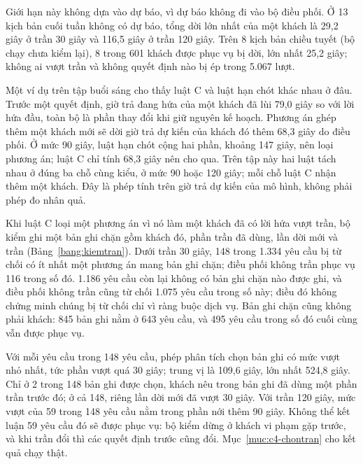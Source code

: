 Giới hạn này không dựa vào dự báo, vì dự báo không đi vào bộ điều phối. Ở 13 kịch bản cuối tuần không có dự báo, tổng
dời lớn nhất của một khách là 29,2 giây ở trần 30 giây và 116,5 giây ở trần 120 giây. Trên 8 kịch bản chiều tuyết (bộ
chạy chưa kiểm lại), 8 trong 601 khách được phục vụ bị dời, lớn nhất 25,2 giây; không ai vượt trần và không quyết định
nào bị ép trong 5.067 lượt.

Một ví dụ trên tập buổi sáng cho thấy luật C và luật hạn chót khác nhau ở đâu. Trước một quyết định, giờ trả đang hứa
của một khách đã lùi 79,0 giây so với lời hứa đầu, toàn bộ là phần thay đổi khi giữ nguyên kế hoạch. Phương án ghép
thêm một khách mới sẽ dời giờ trả dự kiến của khách đó thêm 68,3 giây do điều phối. Ở mức 90 giây, luật hạn chót cộng
hai phần, khoảng 147 giây, nên loại phương án; luật C chỉ tính 68,3 giây nên cho qua. Trên tập này hai luật tách nhau
ở đúng ba chỗ cùng kiểu, ở mức 90 hoặc 120 giây; mỗi chỗ luật C nhận thêm một khách. Đây là phép tính trên giờ trả dự
kiến của mô hình, không phải phép đo nhân quả.

Khi luật C loại một phương án vì nó làm một khách đã có lời hứa vượt trần, bộ kiểm ghi một bản ghi chặn gồm khách đó,
phần trần đã dùng, lần dời mới và trần (Bảng~\ref{bang:kiemtran}). Dưới trần 30 giây, 148 trong 1.334 yêu cầu bị từ
chối có ít nhất một phương án mang bản ghi chặn; điều phối không trần phục vụ 116 trong số đó. 1.186 yêu cầu còn lại
không có bản ghi chặn nào được ghi, và điều phối không trần cũng từ chối 1.075 yêu cầu trong số này; điều đó không
chứng minh chúng bị từ chối chỉ vì ràng buộc dịch vụ. Bản ghi chặn cũng không phải khách: 845 bản ghi nằm ở 643 yêu
cầu, và 495 yêu cầu trong số đó cuối cùng vẫn được phục vụ.

Với mỗi yêu cầu trong 148 yêu cầu, phép phân tích chọn bản ghi có mức vượt nhỏ nhất, tức phần vượt quá 30 giây; trung
vị là 109,6 giây, lớn nhất 524,8 giây. Chỉ ở 2 trong 148 bản ghi được chọn, khách nêu trong bản ghi đã dùng một phần
trần trước đó; ở cả 148, riêng lần dời mới đã vượt 30 giây. Với trần 120 giây, mức vượt của 59 trong 148 yêu cầu nằm
trong phần nới thêm 90 giây. Không thể kết luận 59 yêu cầu đó sẽ được phục vụ: bộ kiểm dừng ở khách vi phạm gặp trước,
và khi trần đổi thì các quyết định trước cũng đổi. Mục~\ref{muc:c4-chontran} cho kết quả chạy thật.

